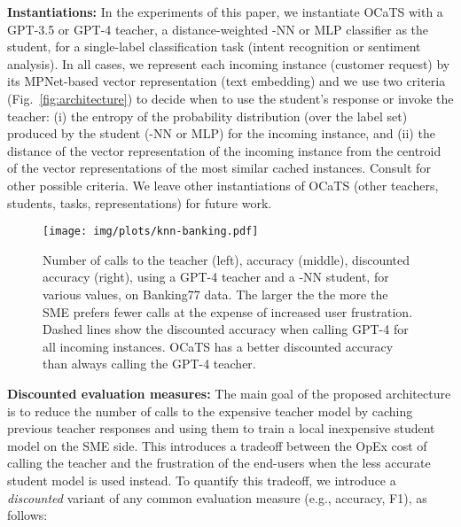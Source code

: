 \documentclass[11pt]{article}
\begin{document}
\vspace{1mm}\noindent\textbf{Instantiations:}
In the experiments of this paper, we instantiate OCaTS with a GPT-3.5 or GPT-4 teacher, a distance-weighted -NN or MLP classifier as the student, for a single-label classification task (intent recognition or sentiment analysis). In all cases, we represent each incoming instance (customer request) by its MPNet-based \cite{song2020mpnet} vector representation (text embedding) and we use two criteria (Fig.~\ref{fig:architecture}) to decide when to use the student's response or invoke the teacher: (i) the entropy of the probability distribution (over the label set) produced by the student (-NN or MLP) for the incoming instance, and (ii) the distance of the vector representation of the incoming instance from the centroid of the vector representations of the  most similar  cached instances. Consult \citet{10.1007/s10994-021-06003-9} for other possible criteria. We leave other instantiations of OCaTS (other teachers, students, tasks, representations) for future work. 

\begin{figure*}[!htpb]
    \centering
    \texttt{[image: img/plots/knn-banking.pdf]}
    \vspace*{-7mm}
    \caption{Number of calls to the teacher (left), accuracy (middle), discounted accuracy (right), using a GPT-4 teacher and a -NN student, for various  values, on Banking77 data. The larger the  the more the SME prefers fewer calls at the expense of increased user frustration. Dashed lines show the discounted accuracy when calling GPT-4 for all incoming instances. OCaTS has a better discounted accuracy than always calling the GPT-4 teacher.} 
    \label{fig:acc_calls}
    \vspace*{-3mm}
\end{figure*}

\vspace{1mm}\noindent\textbf{Discounted evaluation measures:}
The main goal of the proposed architecture is to reduce the number of calls to the expensive teacher model by caching previous teacher responses and using them to train a local inexpensive student model on the SME side. This introduces a tradeoff between the OpEx cost of calling the teacher and the frustration of the end-users when the less accurate student model is used instead. To quantify this tradeoff, we introduce a \emph{discounted} variant  of any common evaluation measure  (e.g., accuracy, F1), as follows:
\end{document}
